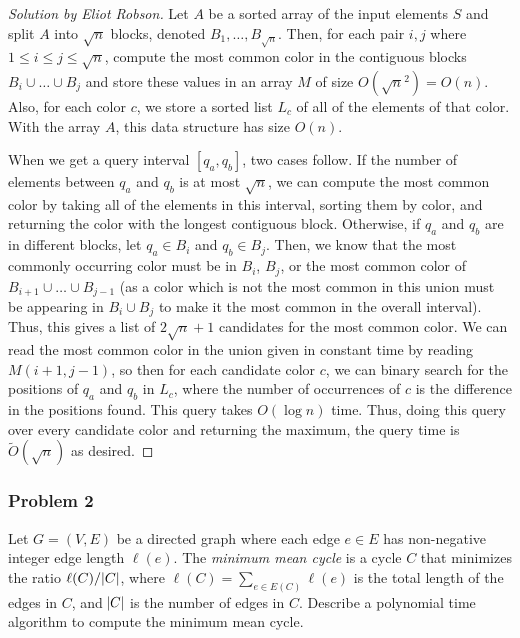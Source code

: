 \documentclass{article}
\newenvironment{solution}[1]{\begin{proof}[Solution by #1]}{\end{proof}}
\newcommand{\OTilde}{\widetilde{O}}
\begin{document}
\begin{solution}{Eliot Robson}
	Let \(A\) be a sorted array of the input elements \(S\) and split \(A\) into \(\sqrt{n}\) blocks, denoted \(B_1, \dots, B_{\sqrt{n}}\). Then, for each pair \(i,j\) where \(1 \leq i \leq j \leq \sqrt{n}\), compute the most common color in the contiguous blocks \(B_i \cup \dots \cup B_j\) and store these values in an array \(M\) of size \(O(\sqrt{n}^2) = O(n)\). Also, for each color \(c\), we store a sorted list \(L_c\) of all of the elements of that color. With the array \(A\), this data structure has size \(O(n)\).
	
	When we get a query interval \([q_a, q_b]\), two cases follow. If the number of elements between \(q_a\) and \(q_b\) is at most \(\sqrt{n}\), we can compute the most common color by taking all of the elements in this interval, sorting them by color, and returning the color with the longest contiguous block. Otherwise, if \(q_a\) and \(q_b\) are in different blocks, let \(q_a \in B_i\) and \(q_b \in B_j\). Then, we know that the most commonly occurring color must be in \(B_i\), \(B_j\), or the most common color of \(B_{i+1} \cup \dots \cup B_{j-1}\) (as a color which is not the most common in this union must be appearing in \(B_i \cup B_j\) to make it the most common in the overall interval). Thus, this gives a list of \(2 \sqrt{n} + 1\) candidates for the most common color. We can read the most common color in the union given in constant time by reading \(M(i+1, j-1)\), so then for each candidate color \(c\), we can binary search for the positions of \(q_a\) and \(q_b\) in \(L_c\), where the number of occurrences of \(c\) is the difference in the positions found. This query takes \(O(\log n)\) time. Thus, doing this query over every candidate color and returning the maximum, the query time is \(\OTilde(\sqrt{n})\) as desired.
\end{solution}

\subsubsection{Problem 2}
Let \(G = (V,E)\) be a directed graph where each edge \(e \in E\) has non-negative integer edge length \(\ell(e)\). The \emph{minimum mean cycle} is a cycle \(C\) that minimizes the ratio \(\ell(C) / \abs{C}\), where \(\ell(C) = \sum_{e \in E(C)} \ell(e)\) is the total length of the edges in \(C\), and \(\abs{C}\) is the number of edges in \(C\). Describe a polynomial time algorithm to compute the minimum mean cycle.
\end{document}
